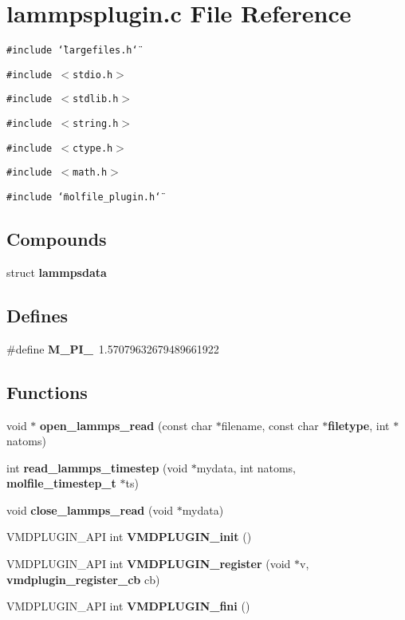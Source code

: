 \section{lammpsplugin.c File Reference}
\label{lammpsplugin_8c}
{\tt \#include \char`\"{}largefiles.h\char`\"{}}\par
{\tt \#include $<$stdio.h$>$}\par
{\tt \#include $<$stdlib.h$>$}\par
{\tt \#include $<$string.h$>$}\par
{\tt \#include $<$ctype.h$>$}\par
{\tt \#include $<$math.h$>$}\par
{\tt \#include \char`\"{}molfile\_\-plugin.h\char`\"{}}\par
\subsection*{Compounds}
\begin{CompactItemize}
\item 
struct {\bf lammpsdata}
\end{CompactItemize}
\subsection*{Defines}
\begin{CompactItemize}
\item 
\#define {\bf M\_\-PI\_}\ 1.57079632679489661922
\end{CompactItemize}
\subsection*{Functions}
\begin{CompactItemize}
\item 
void $\ast$ {\bf open\_\-lammps\_\-read} (const char $\ast$filename, const char $\ast${\bf filetype}, int $\ast$natoms)
\item 
int {\bf read\_\-lammps\_\-timestep} (void $\ast$mydata, int natoms, {\bf molfile\_\-timestep\_\-t} $\ast$ts)
\item 
void {\bf close\_\-lammps\_\-read} (void $\ast$mydata)
\item 
VMDPLUGIN\_\-API int {\bf VMDPLUGIN\_\-init} ()
\item 
VMDPLUGIN\_\-API int {\bf VMDPLUGIN\_\-register} (void $\ast$v, {\bf vmdplugin\_\-register\_\-cb} cb)
\item 
VMDPLUGIN\_\-API int {\bf VMDPLUGIN\_\-fini} ()
\end{CompactItemize}
